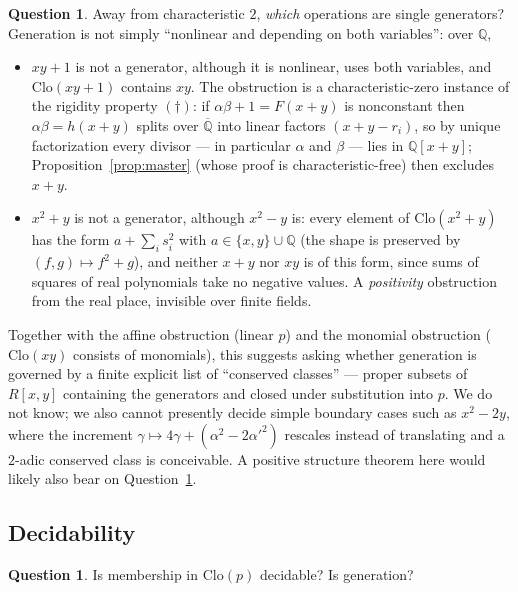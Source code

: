 \documentclass[11pt]{article}
\theoremstyle{definition}
\newtheorem{question}[theorem]{Question}
\theoremstyle{remark}
\newcommand{\Q}{\mathbb{Q}}
\newcommand{\Clo}{\mathrm{Clo}}
\begin{document}
\begin{question}\label{q:characterize}
Away from characteristic $2$, \emph{which} operations are single
generators?
Generation is not simply ``nonlinear and depending on both
variables'': over $\Q$,
\begin{itemize}
\item $xy + 1$ is not a generator, although it is nonlinear, uses both
  variables, and $\Clo(xy+1)$ contains $xy$.  The obstruction is a
  characteristic-zero instance of the rigidity property $(\dagger)$:
  if $\alpha\beta + 1 = F(x{+}y)$ is nonconstant then
  $\alpha\beta = h(x{+}y)$ splits over $\overline{\Q}$ into linear
  factors $(x{+}y-r_i)$, so by unique factorization every divisor ---
  in particular $\alpha$ and $\beta$ --- lies in $\Q[x{+}y]$;
  Proposition~\ref{prop:master} (whose proof is characteristic-free)
  then excludes $x+y$.
\item $x^2 + y$ is not a generator, although $x^2 - y$ is: every element
  of $\Clo(x^2+y)$ has the form $a + \sum_i s_i^2$ with
  $a \in \{x, y\} \cup \Q$ (the shape is preserved by
  $(f,g) \mapsto f^2 + g$), and neither $x+y$ nor $xy$ is of this
  form, since sums of squares of real polynomials take no negative
  values.  A \emph{positivity} obstruction from the real place,
  invisible over finite fields.
\end{itemize}
Together with the affine obstruction (linear $p$) and the monomial
obstruction ($\Clo(xy)$ consists of monomials), this suggests asking
whether generation is governed by a finite explicit list of
``conserved classes'' --- proper subsets of $R[x,y]$ containing the
generators and closed under substitution into $p$.  We do not know;
we also cannot presently decide simple boundary cases such as
$x^2 - 2y$, where the increment $\gamma \mapsto 4\gamma +
(\alpha^2 - 2\alpha'^2)$ rescales instead of translating and a
$2$-adic conserved class is conceivable.  A positive structure
theorem here would likely also bear on
Question~\ref{q:decidable}.
\end{question}

\subsection*{Decidability}

\begin{question}\label{q:decidable}
Is membership in $\Clo(p)$ decidable?  Is generation?
\end{question}
\end{document}
